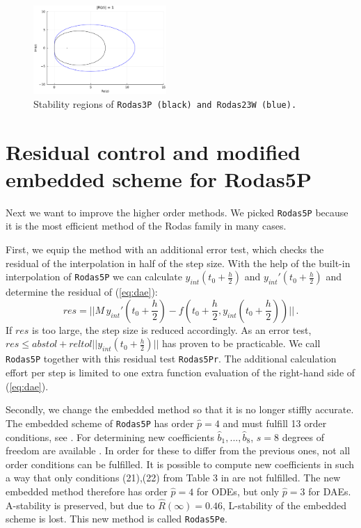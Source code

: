 \documentclass{juliacon}
\begin{document}
\begin{figure}
 \centering
 \includegraphics[width=0.45\textwidth]{stability_rodas3p.pdf}
 \caption{Stability regions of \tt Rodas3P \rm (black) and \tt Rodas23W \rm (blue).}\label{fig:stabrodas3p}
\end{figure}

\section{Residual control and modified embedded scheme for Rodas5P}\label{sec:rodas5pe}

Next we want to improve the higher order methods. We picked \verb|Rodas5P| because it is the most efficient method of the Rodas family in many cases.

First, we equip the method with an additional error test, which checks the residual of the interpolation in half of the step size.
With the help of the built-in interpolation of \verb|Rodas5P| we can calculate $y_{int}(t_0 + \frac{h}{2})$ and $y_{int}'(t_0 + \frac{h}{2})$ and 
determine the residual of (\ref{eq:dae}):
\[ res = ||M \, y_{int}'(t_0 + \frac{h}{2}) - f(t_0 + \frac{h}{2},y_{int}(t_0 + \frac{h}{2}))|| \, .\]
If $res$ is too large, the step size is reduced accordingly. As an error test, $res \leq abstol + reltol ||y_{int}(t_0 + \frac{h}{2})||$ has proven 
to be practicable. We call \verb|Rodas5P| together with this residual test \verb|Rodas5Pr|.
The additional calculation effort per step is limited to one extra function evaluation of the right-hand side of (\ref{eq:dae}).

Secondly, we change the embedded method so that it is no longer stiffly accurate. 
The embedded scheme of \verb|Rodas5P| has order $\hat p = 4$ and must fulfill 13 order conditions, see \cite{rodas5p}. 
For determining new coefficients $\hat b_1,...,\hat b_8$, $s=8$ degrees of freedom are available .
In order for these to differ from the previous ones, not all order conditions can be fulfilled. It is possible to compute new coefficients in such 
a way that only conditions (21),(22) from Table 3 in \cite{rodas5p} are not fulfilled. The new embedded method therefore has 
order $\hat p = 4$ for ODEs, but only $\hat p =3$ for DAEs. A-stability is preserved, but due to $\hat R(\infty)=0.46$, L-stability of the embedded scheme is lost.
This new method is called \verb|Rodas5Pe|.
\end{document}
